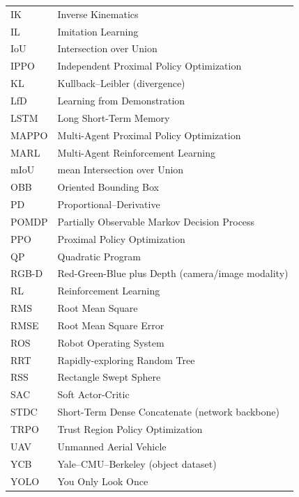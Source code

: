 \begin{xltabular}{\textwidth}{@{}l X@{}}
IK & Inverse Kinematics \\
IL & Imitation Learning \\
IoU & Intersection over Union \\
IPPO & Independent Proximal Policy Optimization \\
KL & Kullback--Leibler (divergence) \\
LfD & Learning from Demonstration \\
LSTM & Long Short-Term Memory \\
MAPPO & Multi-Agent Proximal Policy Optimization \\
MARL & Multi-Agent Reinforcement Learning \\
mIoU & mean Intersection over Union \\
OBB & Oriented Bounding Box \\
PD & Proportional--Derivative \\
POMDP & Partially Observable Markov Decision Process \\
PPO & Proximal Policy Optimization \\
QP & Quadratic Program \\
RGB-D & Red-Green-Blue plus Depth (camera/image modality) \\
RL & Reinforcement Learning \\
RMS & Root Mean Square \\
RMSE & Root Mean Square Error \\
ROS & Robot Operating System \\
RRT & Rapidly-exploring Random Tree \\
RSS & Rectangle Swept Sphere \\
SAC & Soft Actor-Critic \\
STDC & Short-Term Dense Concatenate (network backbone) \\
TRPO & Trust Region Policy Optimization \\
UAV & Unmanned Aerial Vehicle \\
YCB & Yale--CMU--Berkeley (object dataset) \\
YOLO & You Only Look Once \\
\end{xltabular}


